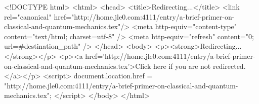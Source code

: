 <!DOCTYPE html>
<html>
<head>
<title>Redirecting...</title>
<link rel="canonical" href="http://home.jle0.com:4111/entry/a-brief-primer-on-classical-and-quantum-mechanics.tex"/>
<meta http-equiv="content-type" content="text/html; charset=utf-8" />
<meta http-equiv="refresh" content="0; url=#{destination_path}" />
</head>
<body>
  <p><strong>Redirecting...</strong></p>
  <p><a href='http://home.jle0.com:4111/entry/a-brief-primer-on-classical-and-quantum-mechanics.tex'>Click here if you are not redirected.</a></p>
  <script>
    document.location.href = "http://home.jle0.com:4111/entry/a-brief-primer-on-classical-and-quantum-mechanics.tex";
  </script>
</body>
</html>
